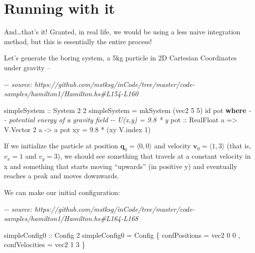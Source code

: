 \documentclass[]{article}
\newenvironment{Shaded}{}{}
\newcommand{\CommentTok}[1]{\textcolor[rgb]{0.38,0.63,0.69}{\textit{#1}}}
\newcommand{\DataTypeTok}[1]{\textcolor[rgb]{0.56,0.13,0.00}{#1}}
\newcommand{\DecValTok}[1]{\textcolor[rgb]{0.25,0.63,0.44}{#1}}
\newcommand{\FloatTok}[1]{\textcolor[rgb]{0.25,0.63,0.44}{#1}}
\newcommand{\FunctionTok}[1]{\textcolor[rgb]{0.02,0.16,0.49}{#1}}
\newcommand{\KeywordTok}[1]{\textcolor[rgb]{0.00,0.44,0.13}{\textbf{#1}}}
\newcommand{\NormalTok}[1]{#1}
\newcommand{\OperatorTok}[1]{\textcolor[rgb]{0.40,0.40,0.40}{#1}}
\newcommand{\OtherTok}[1]{\textcolor[rgb]{0.00,0.44,0.13}{#1}}
\begin{document}
\hypertarget{running-with-it}{%
\section{Running with it}\label{running-with-it}}

And\ldots that's it! Granted, in real life, we would be using a less naive
integration method, but this is essentially the entire process!

Let's generate the boring system, a 5kg particle in 2D Cartesian Coordinates
under gravity --

\begin{Shaded}
\begin{Highlighting}[]
\CommentTok{{-}{-} source: https://github.com/mstksg/inCode/tree/master/code{-}samples/hamilton1/Hamilton.hs\#L154{-}L160}

\OtherTok{simpleSystem ::} \DataTypeTok{System} \DecValTok{2} \DecValTok{2}
\NormalTok{simpleSystem }\OtherTok{=}\NormalTok{ mkSystem (vec2 }\DecValTok{5} \DecValTok{5}\NormalTok{) }\FunctionTok{id}\NormalTok{ pot}
  \KeywordTok{where}
    \CommentTok{{-}{-} potential energy of a gravity field}
    \CommentTok{{-}{-} U(x,y) = 9.8 * y}
\OtherTok{    pot ::} \DataTypeTok{RealFloat}\NormalTok{ a }\OtherTok{=>} \DataTypeTok{V.Vector} \DecValTok{2}\NormalTok{ a }\OtherTok{{-}>}\NormalTok{ a}
\NormalTok{    pot xy }\OtherTok{=} \FloatTok{9.8} \OperatorTok{*}\NormalTok{ (xy }\OtherTok{\textasciigrave{}V.index\textasciigrave{}} \DecValTok{1}\NormalTok{)}
\end{Highlighting}
\end{Shaded}

If we initialize the particle at position
\(\mathbf{q}_0 = \langle 0, 0 \rangle\) and velocity
\(\mathbf{v}_0 = \langle 1, 3 \rangle\) (that is, \(v_x = 1\) and \(v_y = 3\)),
we should see something that travels at a constant velocity in x and something
that starts moving ``upwards'' (in positive y) and eventually reaches a peak and
moves downwards.

We can make our initial configuration:

\begin{Shaded}
\begin{Highlighting}[]
\CommentTok{{-}{-} source: https://github.com/mstksg/inCode/tree/master/code{-}samples/hamilton1/Hamilton.hs\#L164{-}L168}

\OtherTok{simpleConfig0 ::} \DataTypeTok{Config} \DecValTok{2}
\NormalTok{simpleConfig0 }\OtherTok{=} \DataTypeTok{Config}
\NormalTok{    \{ confPositions  }\OtherTok{=}\NormalTok{ vec2 }\DecValTok{0} \DecValTok{0}
\NormalTok{    , confVelocities }\OtherTok{=}\NormalTok{ vec2 }\DecValTok{1} \DecValTok{3}
\NormalTok{    \}}
\end{Highlighting}
\end{Shaded}
\end{document}
